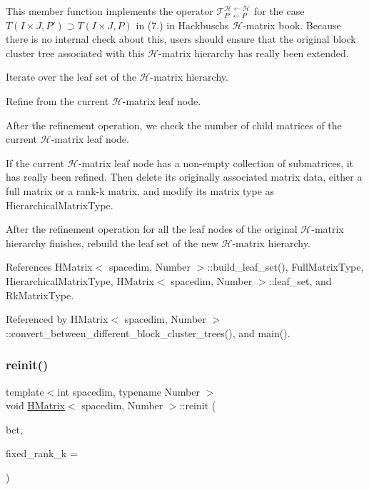 This member function implements the operator $\mathcal{T}_{P' \leftarrow P}^{\mathcal{H} \leftarrow \mathcal{H}}$ for the case $T(I \times J, P') \supset T(I \times J, P)$ in (7.) in Hackbusch\textquotesingle{}s $\mathcal{H}$-\/matrix book. Because there is no internal check about this, users should ensure that the original block cluster tree associated with this $\mathcal{H}$-\/matrix hierarchy has really been extended. 
\begin{DoxyDescription}
\item[Work flow ]

Iterate over the leaf set of the $\mathcal{H}$-\/matrix hierarchy.

Refine from the current $\mathcal{H}$-\/matrix leaf node.

After the refinement operation, we check the number of child matrices of the current $\mathcal{H}$-\/matrix leaf node.

If the current $\mathcal{H}$-\/matrix leaf node has a non-\/empty collection of submatrices, it has really been refined. Then delete its originally associated matrix data, either a full matrix or a rank-\/k matrix, and modify its matrix type as {\ttfamily Hierarchical\+Matrix\+Type}.

After the refinement operation for all the leaf nodes of the original $\mathcal{H}$-\/matrix hierarchy finishes, rebuild the leaf set of the new $\mathcal{H}$-\/matrix hierarchy.


\end{DoxyDescription}

References H\+Matrix$<$ spacedim, Number $>$\+::build\+\_\+leaf\+\_\+set(), Full\+Matrix\+Type, Hierarchical\+Matrix\+Type, H\+Matrix$<$ spacedim, Number $>$\+::leaf\+\_\+set, and Rk\+Matrix\+Type.



Referenced by H\+Matrix$<$ spacedim, Number $>$\+::convert\+\_\+between\+\_\+different\+\_\+block\+\_\+cluster\+\_\+trees(), and main().

\mbox{\label{classHMatrix_a83f804163e1695cfb952ddb6b0df2503}} 
\subsubsection{\texorpdfstring{reinit()}{reinit()}\hspace{0.1cm}{\footnotesize\ttfamily [1/2]}}
{\footnotesize\ttfamily template$<$int spacedim, typename Number $>$ \\
void \hyperlink{classHMatrix}{H\+Matrix}$<$ spacedim, Number $>$\+::reinit (\begin{DoxyParamCaption}\item[{const \hyperlink{classBlockClusterTree}{Block\+Cluster\+Tree}$<$ spacedim, Number $>$ \&}]{bct,  }\item[{const unsigned int}]{fixed\+\_\+rank\+\_\+k = {} }\end{DoxyParamCaption})}

